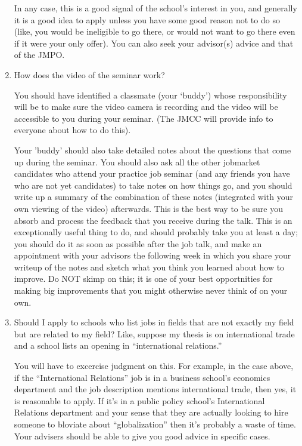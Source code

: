 \documentclass{econtex}
\begin{document}
\begin{enumerate}
In any case, this is a good signal of the school's interest in you, and generally it is a good idea to apply
unless you have some good reason not to do so (like, you would be ineligible to go there, or would not want to 
go there even if it were your only offer).  You can also seek your advisor(s) advice and that of the JMPO.


\item How does the video of the seminar work?
  
  You should have identified a classmate (your `buddy') whose
  responsibility will be to make sure the video camera is recording
  and the video will be accessible to you during your seminar.  (The
  JMCC will provide info to everyone about how to do this).  

  Your 'buddy' should also take detailed notes about the questions
  that come up during the seminar.  You should also ask all the other
  jobmarket candidates who attend your practice job seminar (and any
  friends you have who are not yet candidates) to take notes on how
  things go, and you should write up a summary of the combination of
  these notes (integrated with your own viewing of the video)
  afterwards.  This is the best way to be sure you absorb and process
  the feedback that you receive during the talk.  This is an
  exceptionally useful thing to do, and should probably take you at least
  a day; you should do it as soon as possible after the job talk, and
  make an appointment with your advisors the following week in which
  you share your writeup of the notes and sketch what you think you
  learned about how to improve.  Do NOT skimp on this; it is one of
  your best opportnities for making big improvements that you might
  otherwise never think of on your own.

\item Should I apply to schools who list jobs in fields that are not exactly my field but are related to my
field?  Like, suppose my thesis is on international trade and a school lists
an opening in ``international relations.''

You will have to excercise judgment on this.  For example, in the case
above, if the ``International Relations'' job is in a business
school's economics department and the job description mentions
international trade, then yes, it is reasonable to apply.  If it's in
a public policy school's International Relations department and your
sense that they are actually looking to hire someone to bloviate about
``globalization'' then it's probably a waste of time.  Your advisers
should be able to give you good advice in specific cases.


\end{enumerate}
\end{document}
